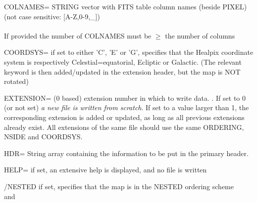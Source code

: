 \begin{keywords}
  \begin{kwlist}{} %
       \item[{COLNAMES=}] 
STRING vector with FITS table column names (beside PIXEL) (not case sensitive: [A-Z,0-9,\_])\\
         \\
         If provided the number of COLNAMES must be $\ge$ the number of columns

       \item[{COORDSYS=}] 
		if set to either 'C', 'E' or 'G',  specifies that the
		Healpix coordinate system is respectively Celestial=equatorial,
		  Ecliptic or Galactic.
		(The relevant keyword is then added/updated in the extension
		  header, but the map is NOT rotated)

	\item[{EXTENSION=}] 
	  (0 based) extension number in which to write data. .
	  If set to 0 (or not set) {\em a new file is written from scratch}.
	  If set to a value
		  larger than 1, the corresponding extension is added or
		  updated, as long as all previous extensions already exist.
		  All extensions of the same file should use the same ORDERING,
		  NSIDE and COORDSYS.

    	\item[HDR=] %
		String array containing the information to be put in
		the primary header. 

    	\item[HELP=] %
		if set, an extensive help is displayed, and no file is written

	\item[{/NESTED}]%
         if set, specifies that the map is in the NESTED ordering
	scheme\\
	\seealso {} 
	and 


\end{kwlist}
\end{keywords}
